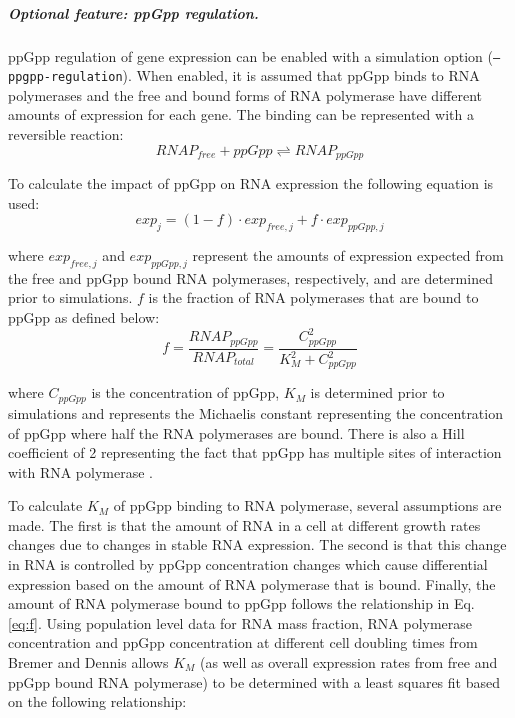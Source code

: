 \documentclass[12pt]{article}
\begin{document}
\subparagraph{Optional feature: ppGpp regulation.}
ppGpp regulation of gene expression can be enabled with a simulation option (\texttt{--ppgpp-regulation}).  When enabled, it is assumed that ppGpp binds to RNA polymerases and the free and bound forms of RNA polymerase have different amounts of expression for each gene.  The binding can be represented with a reversible reaction:
\begin{equation}
RNAP_{free} + ppGpp \rightleftharpoons RNAP_{ppGpp}
\end{equation}

\noindent To calculate the impact of ppGpp on RNA expression the following equation is used:
\begin{equation}
exp_j = (1-f)\cdot exp_{free, j} + f\cdot exp_{ppGpp, j}
\label{eq:exp-ppgpp}
\end{equation}

\noindent where $exp_{free, j}$ and $exp_{ppGpp, j}$ represent the amounts of expression expected from the free and ppGpp bound RNA polymerases, respectively, and are determined prior to simulations. $f$ is the fraction of RNA polymerases that are bound to ppGpp as defined below:
\begin{equation}
f = \frac{RNAP_{ppGpp}}{RNAP_{total}} = \frac{C_{ppGpp}^2}{K_M^2 + C_{ppGpp}^2}
\label{eq:f}
\end{equation}

\noindent where $C_{ppGpp}$ is the concentration of ppGpp, $K_M$ is determined prior to simulations and represents the Michaelis constant representing the concentration of ppGpp where half the RNA polymerases are bound.  There is also a Hill coefficient of 2 representing the fact that ppGpp has multiple sites of interaction with RNA polymerase \cite{sanchez2019genome}.

To calculate $K_M$ of ppGpp binding to RNA polymerase, several assumptions are made.  The first is that the amount of RNA in a cell at different growth rates changes due to changes in stable RNA expression.  The second is that this change in RNA is controlled by ppGpp concentration changes which cause differential expression based on the amount of RNA polymerase that is bound.  Finally, the amount of RNA polymerase bound to ppGpp follows the relationship in Eq. \ref{eq:f}.  Using population level data for RNA mass fraction, RNA polymerase concentration and ppGpp concentration at different cell doubling times from Bremer and Dennis \cite{Bremer:1996uj} allows $K_M$ (as well as overall expression rates from free and ppGpp bound RNA polymerase) to be determined with a least squares fit based on the following relationship:
\end{document}
